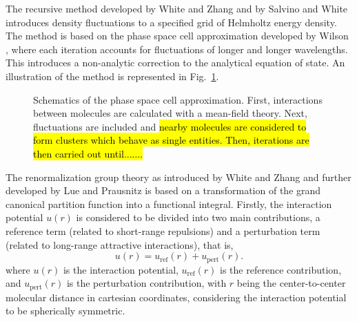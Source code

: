 \documentclass[preprint,12pt,3p]{elsarticle}
\begin{document}
The recursive method developed by White and Zhang \cite{white1993renormalization, white1995renormalization, white1998renormalization} and by Salvino and White \citep{salvino1992calculation} introduces density fluctuations to a specified grid of Helmholtz energy density.
The method is based on the phase space cell approximation developed by Wilson \cite{wilson1971renormalization, wilson1971brenormalization}, where each iteration accounts for fluctuations of longer and longer wavelengths.
This introduces a non-analytic correction to the analytical equation of state.
An illustration of the method is represented in Fig.~\ref{fig:schematics}.

\begin{figure}[h!]
\centering
\captionsetup{justification=centering}
\caption{Schematics of the phase space cell approximation. First, interactions between molecules are calculated with a mean-field theory. Next, fluctuations are included and \hl{nearby molecules are considered to form clusters which behave as single entities. Then, iterations are then carried out until.......}}
\label{fig:schematics}
\end{figure}

The renormalization group theory as introduced by White and Zhang \cite{white1993renormalization} and further developed by Lue and Prausnitz \cite{lue1998renormalization, lue1998brenormalization} is based on a transformation of the grand canonical partition function into a functional integral.
Firstly, the interaction potential $u(r)$ is considered to be divided into two main contributions, a reference term (related to short-range repulsions) and a perturbation term (related to long-range attractive interactions), that is,
\begin{equation} \label{eq:u(r)}
u(r) = u_\text{ref}(r) + u_\text{pert}(r).
\end{equation}
where $u(r)$ is the interaction potential, $u_\text{ref}(r)$ is the reference contribution, and $u_\text{pert}(r)$ is the perturbation contribution, with $r$ being the center-to-center molecular distance in cartesian coordinates, considering the interaction potential to be spherically symmetric.
\end{document}
